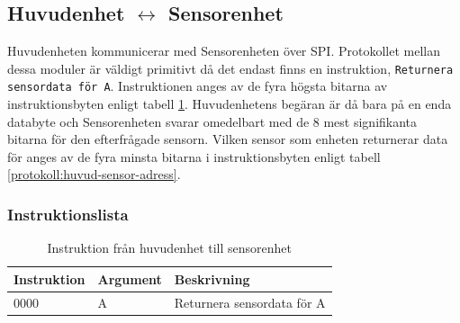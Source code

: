 \subsection{Huvudenhet $\longleftrightarrow$ Sensorenhet} \label{protokoll-huvud-sensor}

Huvudenheten kommunicerar med Sensorenheten över SPI. Protokollet mellan dessa moduler är väldigt primitivt då det endast finns en instruktion, \texttt{Returnera sensordata för A}. Instruktionen anges av de fyra högsta bitarna av instruktionsbyten enligt tabell \ref{protokoll:huvud-sensor}. Huvudenhetens begäran är då bara på en enda databyte och Sensorenheten svarar omedelbart med de 8 mest signifikanta bitarna för den efterfrågade sensorn. Vilken sensor som enheten returnerar data för anges av de fyra minsta bitarna i instruktionsbyten enligt tabell \ref{protokoll:huvud-sensor-adress}.

\subsubsection{Instruktionslista}

\begin{table}[h!]
	\centering
	\begin{tabularx}{\textwidth}{| l | l | X |}
		\hline
		\textbf{Instruktion} & \textbf{Argument} & \textbf{Beskrivning} \\\hline
		{0000} & {A} & {Returnera sensordata för A} \\\hline
	\end{tabularx}
	\caption{Instruktion från huvudenhet till sensorenhet} \label{protokoll:huvud-sensor}
\end{table}

